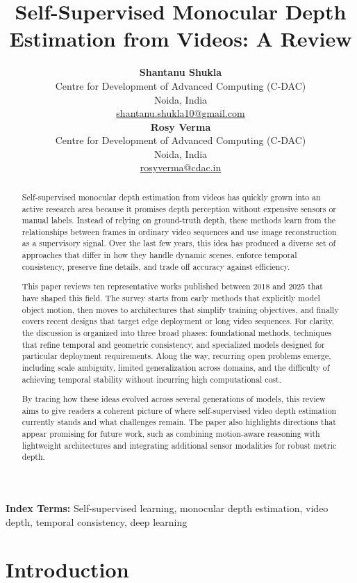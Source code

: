 \documentclass[10pt,twocolumn,letterpaper]{article}
\title{\textbf{Self-Supervised Monocular Depth Estimation from Videos: A Review}}
\author{
\begin{minipage}[t]{0.45\textwidth}
\centering
\textbf{Shantanu Shukla}\\
Centre for Development of Advanced Computing (C-DAC)\\
Noida, India\\
\href{mailto:shantanu.shukla10@gmail.com}{shantanu.shukla10@gmail.com}
\end{minipage}
\hfill
\begin{minipage}[t]{0.45\textwidth}
\centering
\textbf{Rosy Verma}\\
Centre for Development of Advanced Computing (C-DAC)\\
Noida, India\\
\href{mailto:rosyverma@cdac.in}{rosyverma@cdac.in}
\end{minipage}
}
\date{}
\begin{document}
\maketitle

\begin{abstract}
Self-supervised monocular depth estimation from videos has quickly grown into an active research area because it promises depth perception without expensive sensors or manual labels. Instead of relying on ground-truth depth, these methods learn from the relationships between frames in ordinary video sequences and use image reconstruction as a supervisory signal. Over the last few years, this idea has produced a diverse set of approaches that differ in how they handle dynamic scenes, enforce temporal consistency, preserve fine details, and trade off accuracy against efficiency.

This paper reviews ten representative works published between 2018 and 2025 that have shaped this field. The survey starts from early methods that explicitly model object motion, then moves to architectures that simplify training objectives, and finally covers recent designs that target edge deployment or long video sequences. For clarity, the discussion is organized into three broad phases: foundational methods, techniques that refine temporal and geometric consistency, and specialized models designed for particular deployment requirements. Along the way, recurring open problems emerge, including scale ambiguity, limited generalization across domains, and the difficulty of achieving temporal stability without incurring high computational cost.

By tracing how these ideas evolved across several generations of models, this review aims to give readers a coherent picture of where self-supervised video depth estimation currently stands and what challenges remain. The paper also highlights directions that appear promising for future work, such as combining motion-aware reasoning with lightweight architectures and integrating additional sensor modalities for robust metric depth.
\end{abstract}

\noindent \textbf{Index Terms:} Self-supervised learning, monocular depth estimation, video depth, temporal consistency, deep learning

\section{Introduction}
\label{sec:intro}
\end{document}
